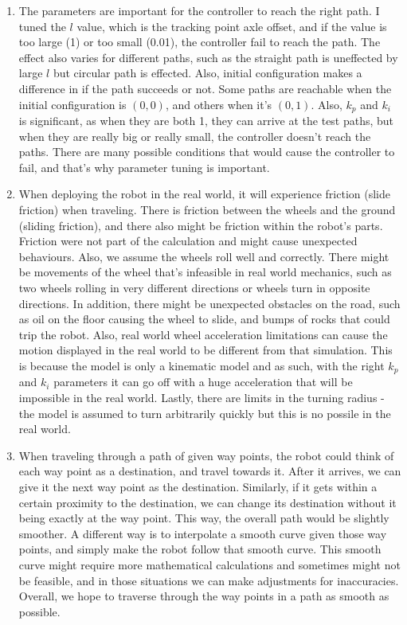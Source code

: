 \documentclass{article}
\begin{document}
\begin{enumerate}
    \item The parameters are important for the controller to reach the right path. I tuned the $l$ value, which is the tracking point axle offset, and if the value is too large (1) or too small (0.01), the controller fail to reach the path. The effect also varies for different paths, such as the straight path is uneffected by large $l$ but circular path is effected. Also, initial configuration makes a difference in if the path succeeds or not. Some paths are reachable when the initial configuration is $(0,0)$, and others when it's $(0,1)$. Also, $k_p$ and $k_i$ is significant, as when they are both 1, they can arrive at the test paths, but when they are really big or really small, the controller doesn't reach the paths. There are many possible conditions that would cause the controller to fail, and that's why parameter tuning is important.
    
    \item When deploying the robot in the real world, it will experience friction (slide friction) when traveling. There is friction between the wheels and the ground (sliding friction), and there also might be friction within the robot's parts. Friction were not part of the calculation and might cause unexpected behaviours. Also, we assume the wheels roll well and correctly. There might be movements of the wheel that's infeasible in real world mechanics, such as two wheels rolling in very different directions or wheels turn in opposite directions. In addition, there might be unexpected obstacles on the road, such as oil on the floor causing the wheel to slide, and bumps of rocks that could trip the robot. Also, real world wheel acceleration limitations can cause the motion displayed in the real world to be different from that simulation. This is because the model is only a kinematic model and as such, with the right $k_p$ and $k_i$ parameters it can go off with a huge acceleration that will be impossible in the real world. Lastly, there are limits in the turning radius - the model is assumed to turn arbitrarily quickly but this is no possile in the real world. 
    
    \item When traveling through a path of given way points, the robot could think of each way point as a destination, and travel towards it. After it arrives, we can give it the next way point as the destination. Similarly, if it gets within a certain proximity to the destination, we can change its destination without it being exactly at the way point. This way, the overall path would be slightly smoother. A different way is to interpolate a smooth curve given those way points, and simply make the robot follow that smooth curve. This smooth curve might require more mathematical calculations and sometimes might not be feasible, and in those situations we can make adjustments for inaccuracies. Overall, we hope to traverse through the way points in a path as smooth as possible.

\end{enumerate}
\newpage  
\end{document}
